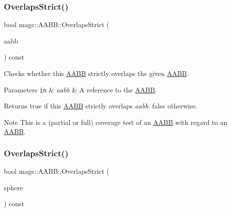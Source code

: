 \subsubsection{\texorpdfstring{Overlaps\+Strict()}{OverlapsStrict()}\hspace{0.1cm}{\footnotesize\ttfamily [1/2]}}
{\footnotesize\ttfamily bool mage\+::\+A\+A\+B\+B\+::\+Overlaps\+Strict (\begin{DoxyParamCaption}\item[{const \mbox{\hyperlink{classmage_1_1_a_a_b_b}{A\+A\+BB}} \&}]{aabb }\end{DoxyParamCaption}) const\hspace{0.3cm}{\ttfamily [noexcept]}}

Checks whether this \mbox{\hyperlink{classmage_1_1_a_a_b_b}{A\+A\+BB}} strictly overlaps the given \mbox{\hyperlink{classmage_1_1_a_a_b_b}{A\+A\+BB}}.


\begin{DoxyParams}[1]{Parameters}
\mbox{\tt in}  & {\em aabb} & A reference to the \mbox{\hyperlink{classmage_1_1_a_a_b_b}{A\+A\+BB}}. \\
\hline
\end{DoxyParams}
\begin{DoxyReturn}{Returns}
{\ttfamily true} if this \mbox{\hyperlink{classmage_1_1_a_a_b_b}{A\+A\+BB}} strictly overlaps {\itshape aabb}. {\ttfamily false} otherwise. 
\end{DoxyReturn}
\begin{DoxyNote}{Note}
This is a (partial or full) coverage test of an \mbox{\hyperlink{classmage_1_1_a_a_b_b}{A\+A\+BB}} with regard to an \mbox{\hyperlink{classmage_1_1_a_a_b_b}{A\+A\+BB}}. 
\end{DoxyNote}
\mbox{\label{classmage_1_1_a_a_b_b_af5e8507258d4990abec9f6261449c6a9}} 
\subsubsection{\texorpdfstring{Overlaps\+Strict()}{OverlapsStrict()}\hspace{0.1cm}{\footnotesize\ttfamily [2/2]}}
{\footnotesize\ttfamily bool mage\+::\+A\+A\+B\+B\+::\+Overlaps\+Strict (\begin{DoxyParamCaption}\item[{const \mbox{\hyperlink{classmage_1_1_bounding_sphere}{Bounding\+Sphere}} \&}]{sphere }\end{DoxyParamCaption}) const\hspace{0.3cm}{\ttfamily [noexcept]}}

